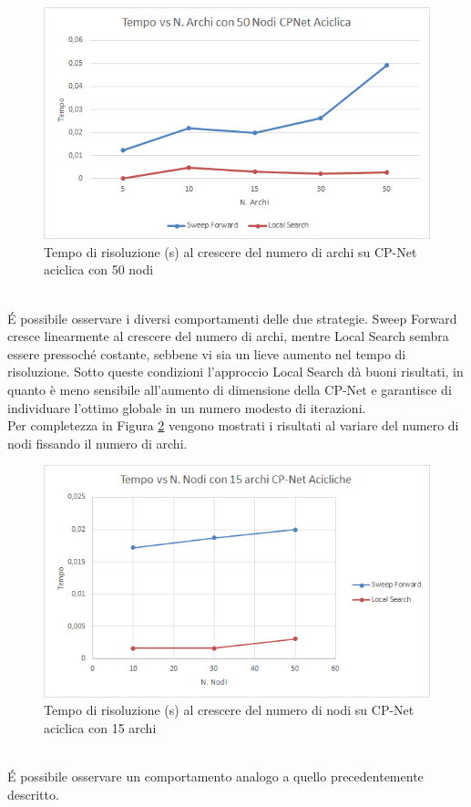 \documentclass[a4paper,titlepage]{article}
\begin{document}
\begin{figure}[!h]
\centering
\includegraphics[scale=0.8]{../img/50NodiAciclica.png}
\caption{Tempo di risoluzione (s) al crescere del numero di archi su CP-Net aciclica con 50 nodi}\label{fig:test3}
\end{figure}
\\\'E possibile osservare i diversi comportamenti delle due strategie. Sweep Forward cresce linearmente al crescere del numero di archi, mentre Local Search sembra essere pressoché costante, sebbene vi sia un lieve aumento nel tempo di risoluzione. Sotto queste condizioni l'approccio Local Search dà buoni risultati, in quanto è meno sensibile all'aumento di dimensione della CP-Net e garantisce di individuare l'ottimo globale in un numero modesto di iterazioni.\\
Per completezza in Figura \ref{fig:test8} vengono mostrati i risultati al variare del numero di nodi fissando il numero di archi.
\begin{figure}[!h]
\centering
\includegraphics[scale=0.8]{../img/15ArchiAciclica.png}
\caption{Tempo di risoluzione (s) al crescere del numero di nodi su CP-Net aciclica con 15 archi}\label{fig:test8}
\end{figure}
\\\'E possibile osservare un comportamento analogo a quello precedentemente descritto.
\end{document}
